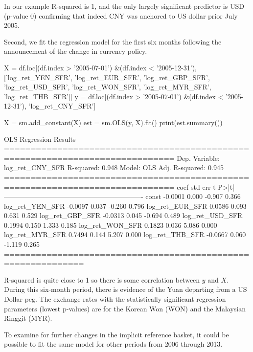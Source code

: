 In our example R-squared is 1, and the only largely significant predictor is USD (p-value 0) confirming that indeed CNY was anchored to US dollar prior July 2005.

Second, we fit the regression model for the first six months following the announcement of the change in currency policy.

\begin{ipython}
X = df.loc[(df.index > '2005-07-01') &(df.index < '2005-12-31'),
           ['log_ret_YEN_SFR', 'log_ret_EUR_SFR', 
            'log_ret_GBP_SFR', 'log_ret_USD_SFR',
            'log_ret_WON_SFR', 'log_ret_MYR_SFR', 
            'log_ret_THB_SFR']]
y = df.loc[(df.index > '2005-07-01') &(df.index < '2005-12-31'),
           'log_ret_CNY_SFR']

X = sm.add_constant(X)
est = sm.OLS(y, X).fit()
print(est.summary())
\end{ipython}
\begin{ioutput}
                            OLS Regression Results                            
==============================================================================
Dep. Variable:        log_ret_CNY_SFR   R-squared:                       0.948
Model:                            OLS   Adj. R-squared:                  0.945
==============================================================================
                      coef    std err          t      P>|t|
-------------------------------------------------------------
const              -0.0001      0.000     -0.907      0.366
log_ret_YEN_SFR    -0.0097      0.037     -0.260      0.796
log_ret_EUR_SFR     0.0586      0.093      0.631      0.529
log_ret_GBP_SFR    -0.0313      0.045     -0.694      0.489
log_ret_USD_SFR     0.1994      0.150      1.333      0.185
log_ret_WON_SFR     0.1823      0.036      5.086      0.000
log_ret_MYR_SFR     0.7494      0.144      5.207      0.000
log_ret_THB_SFR    -0.0667      0.060     -1.119      0.265
=============================================================
\end{ioutput}

R-squared is quite close to 1 so there is some correlation between $y$ and $X$.
During this six-month period, there is evidence of the Yuan departing from a US Dollar peg. The exchange rates with the statistically significant regression parameters (lowest p-values) are for the Korean Won (WON) and the Malaysian Ringgit (MYR).

To examine for further changes in the implicit reference basket, it could be possible to fit the same model for other periods from 2006 through 2013.

